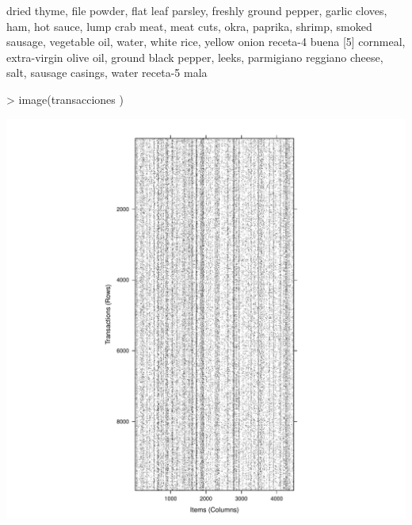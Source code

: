 \documentclass [a4paper] {article}
\begin{document}
\begin{Schunk}
\begin{Soutput}
{     dried thyme,                                               
     file powder,                                               
     flat leaf parsley,                                         
     freshly ground pepper,                                     
     garlic cloves,                                             
     ham,                                                       
     hot sauce,                                                 
     lump crab meat,                                            
     meat cuts,                                                 
     okra,                                                      
     paprika,                                                   
     shrimp,                                                    
     smoked sausage,                                            
     vegetable oil,                                             
     water,                                                     
     white rice,                                                
     yellow onion}                         receta-4 buena       
[5] {cornmeal,                                                  
     extra-virgin olive oil,                                    
     ground black pepper,                                       
     leeks,                                                     
     parmigiano reggiano cheese,                                
     salt,                                                      
     sausage casings,                                           
     water}                                receta-5 mala        
\end{Soutput}
\end{Schunk}
\begin{Schunk}
\begin{Sinput}
> image(transacciones )
\end{Sinput}
\end{Schunk}
\includegraphics{Practica2-transacciones}
\end{document}
